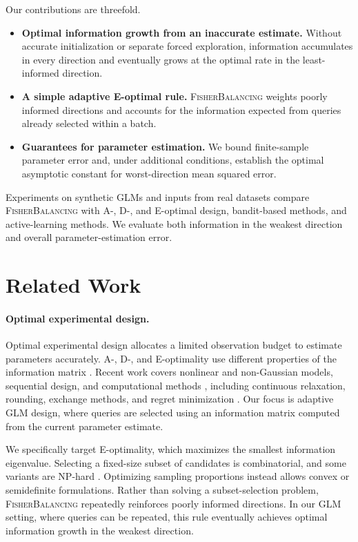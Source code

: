 \documentclass[10pt,twoside,letterpaper]{article}
\newcommand{\FB}{\textnormal{\textsc{FisherBalancing}}}
\begin{document}
Our contributions are threefold.
\begin{itemize}
    \item \textbf{Optimal information growth from an inaccurate estimate.}
    Without accurate initialization or separate forced exploration,
    information accumulates in every direction and eventually grows at
    the optimal rate in the least-informed direction.

    \item \textbf{A simple adaptive E-optimal rule.}
    \FB{} weights poorly informed directions and accounts for the
    information expected from queries already selected within a batch.

    \item \textbf{Guarantees for parameter estimation.}
    We bound finite-sample parameter error and, under additional
    conditions, establish the optimal asymptotic constant for
    worst-direction mean squared error.
\end{itemize}

Experiments on synthetic GLMs and inputs from real datasets compare
\FB{} with A-, D-, and E-optimal design, bandit-based methods, and
active-learning methods. We evaluate both information in the weakest
direction and overall parameter-estimation error.










\section{Related Work}
\label{sec:related}

\paragraph{Optimal experimental design.}
Optimal experimental design allocates a limited observation budget to
estimate parameters accurately. A-, D-, and E-optimality use different
properties of the information matrix \cite{Pukelsheim2006}. Recent work
covers nonlinear and non-Gaussian models, sequential design, and
computational methods \cite{HuanJagalurMarzouk2024}, including continuous
relaxation, rounding, exchange methods, and regret minimization
\cite{AllenZhu2017}.
Our focus is adaptive GLM design, where queries are selected using an
information matrix computed from the current parameter estimate.

We specifically target E-optimality, which maximizes the smallest
information eigenvalue. Selecting a fixed-size subset of candidates is
combinatorial, and some variants are NP-hard
\cite{BrownLaddhaSingh2024}. Optimizing sampling proportions instead
allows convex or semidefinite formulations. Rather than solving a
subset-selection problem, \FB{} repeatedly reinforces poorly informed
directions. In our GLM setting, where queries can be repeated, this rule
eventually achieves optimal information growth in the weakest direction.
\end{document}
